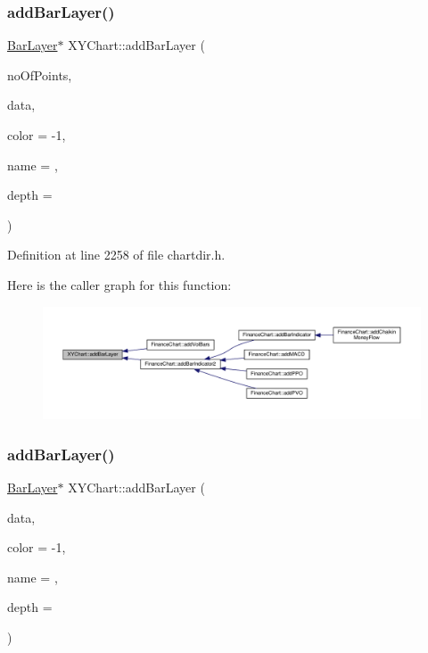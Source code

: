 \subsubsection{\texorpdfstring{add\+Bar\+Layer()}{addBarLayer()}\hspace{0.1cm}{\footnotesize\ttfamily [1/5]}}
{\footnotesize\ttfamily \hyperlink{class_bar_layer}{Bar\+Layer}$\ast$ X\+Y\+Chart\+::add\+Bar\+Layer (\begin{DoxyParamCaption}\item[{int}]{no\+Of\+Points,  }\item[{const double $\ast$}]{data,  }\item[{int}]{color = {\ttfamily -\/1},  }\item[{const char $\ast$}]{name = {},  }\item[{int}]{depth = {} }\end{DoxyParamCaption})\hspace{0.3cm}{\ttfamily [inline]}}



Definition at line 2258 of file chartdir.\+h.

Here is the caller graph for this function\+:
\nopagebreak
\begin{figure}[H]
\begin{center}
\leavevmode
\includegraphics[width=350pt]{class_x_y_chart_afb3bb487fa8f9ea3c2d142cb7fed7eab_icgraph}
\end{center}
\end{figure}
\mbox{\label{class_x_y_chart_ae821562406a385684737ab013a72ffa6}} 
\subsubsection{\texorpdfstring{add\+Bar\+Layer()}{addBarLayer()}\hspace{0.1cm}{\footnotesize\ttfamily [2/5]}}
{\footnotesize\ttfamily \hyperlink{class_bar_layer}{Bar\+Layer}$\ast$ X\+Y\+Chart\+::add\+Bar\+Layer (\begin{DoxyParamCaption}\item[{\hyperlink{class_double_array}{Double\+Array}}]{data,  }\item[{int}]{color = {\ttfamily -\/1},  }\item[{const char $\ast$}]{name = {},  }\item[{int}]{depth = {} }\end{DoxyParamCaption})\hspace{0.3cm}{\ttfamily [inline]}}



